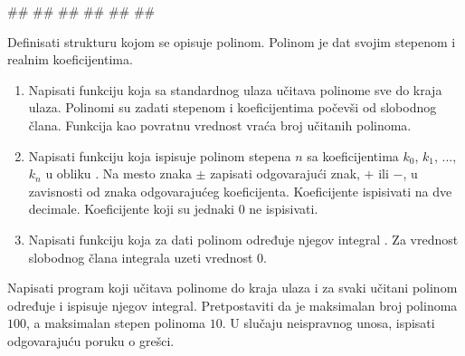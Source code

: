\begin{Exercise}[difficulty=1, label=struc.8]
\begin{miditest}
\begin{upotreba}{3}
#\naslovInt#
##
##
##
##
##
\end{upotreba}
\end{miditest}

\end{Exercise}
\ifresenja
\begin{Answer}[ref=struc.8]
\end{Answer}
\fi


\begin{Exercise}[difficulty=1, label=struc.15] 
Definisati strukturu kojom se opisuje polinom. Polinom je dat svojim
stepenom i realnim koeficijentima. 
\begin{enumerate}
\item Napisati funkciju  koja sa standardnog ulaza učitava polinome sve do 
      kraja ulaza. Polinomi su zadati stepenom i koeficijentima počevši od slobodnog člana. Funkcija kao 
      povratnu vrednost vraća broj učitanih polinoma.
\item Napisati funkciju  koja ispisuje polinom stepena $n$ sa koeficijentima $k_0$, $k_1$, ..., $k_n$ u obliku .  Na mesto znaka $\pm$ zapisati odgovarajući znak, $+$ ili $-$,
  u zavisnosti od znaka odgovarajućeg koeficijenta. Koeficijente ispisivati na dve decimale. Koeficijente koji su jednaki
  $0$ ne ispisivati.  
\item Napisati funkciju  koja za dati polinom  određuje njegov integral . Za vrednost slobodnog člana integrala uzeti vrednost 0. 
\end{enumerate}
Napisati program koji učitava polinome do kraja ulaza i za svaki učitani polinom
  određuje i ispisuje njegov integral.  
  Pretpostaviti da je maksimalan broj polinoma $100$, a maksimalan stepen polinoma $10$.
U slučaju neispravnog unosa, ispisati odgovarajuću poruku o grešci.


\end{Exercise}
